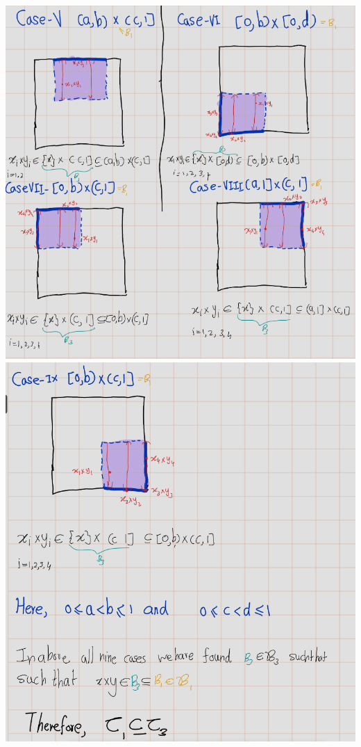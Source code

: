 \documentclass[
]{book}
\theoremstyle{definition}
\theoremstyle{definition}
\theoremstyle{definition}
\theoremstyle{definition}
\theoremstyle{remark}
\begin{document}
\includegraphics{figures/Exercises/Ex 2.16/ex-10-3.png}
\includegraphics{figures/Exercises/Ex 2.16/ex-10-4.png}
\end{document}
